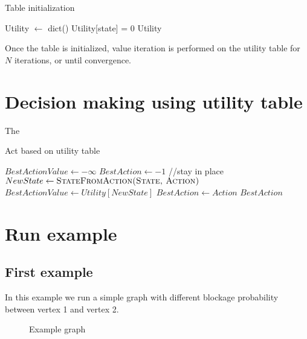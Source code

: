 \documentclass{article}                     %
\begin{document}
\begin{algorithm}
	\caption{Table initialization}
	\label{alg:tabinit}		
	\begin{algorithmic}[1]
		\State Utility $ \leftarrow  $ dict()
		\State  Utility[state] = 0
		\EndIf
		\EndFor
		\State \Return Utility
		\EndProcedure
	\end{algorithmic}
\end{algorithm}

Once the table is initialized, value iteration is performed on the utility table for $ N $ iterations, or until convergence. 

\section{Decision making using utility table}
The 
\begin{algorithm}
	\caption{Act based on utility table}
	\label{alg:dm}		
	\begin{algorithmic}[1]
		\State $ BestActionValue \leftarrow -\infty $
		\State $ BestAction \leftarrow -1 $  //stay in place
		\State $ NewState \leftarrow \textsc{StateFromAction(State, Action)} $
		\State  $ BestActionValue \leftarrow Utility[NewState]$
		\State  $ BestAction \leftarrow Action$
		\EndIf
		\EndFor
		\State \Return $ BestAction $
		\EndProcedure
	\end{algorithmic}
\end{algorithm}

\section{Run example}
\subsection{First example}
In this example we run a simple graph with different blockage probability between vertex 1 and vertex 2.
\begin{figure}
	\centering
	\caption{Example graph}
	\label{fig:bn2}
\end{figure}
\end{document}
